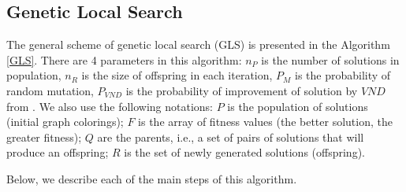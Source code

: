 \documentclass[runningheads]{llncs}
\begin{document}
\subsection{Genetic Local Search}
The general scheme of genetic local search (GLS) is presented in the Algorithm \ref{GLS}. There are 4 parameters in this algorithm: $n_P$ is the number of solutions in population,  $n_R$ is the size of offspring in each iteration, $P_M$ is the probability of random mutation, $P_{VND}$ is the probability of improvement of solution by $VND$ from \cite{Erzin:24}. We also use the following notations: $P$ is the population of solutions (initial graph colorings); $F$ is the array of fitness values (the better solution, the greater fitness); $Q$ are the parents, i.e., a set of pairs of solutions that will produce an offspring; $R$ is the set of newly generated solutions (offspring).

Below, we describe each of the main steps of this algorithm.
\end{document}
